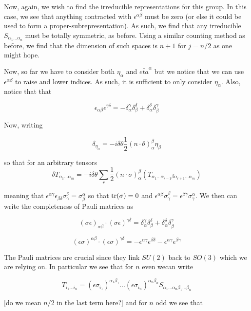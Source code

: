 \documentclass{article}
\theoremstyle{definition}
\begin{document}
Now, again, we wish to find the irreducible representations for this group. In
this case, we see that anything contracted with $\epsilon^{\alpha \beta}$ must
be zero (or else it could be used to form a proper-subrepresentation). As such,
we find that any irreducible $S_{\alpha_1 \dots \alpha_n}$ must be totally
symmetric, as before. Using a similar counting method as before, we find that
the dimension of such spaces is $n + 1$ for $j = n/2$ as one might hope. 

Now, so far we have to consider both $\eta_\alpha$ and $\bar{eta}^\alpha$ but we
notice that we can use $\epsilon^{\alpha \beta}$ to raise and lower indices. As
such, it is sufficient to only consider $\eta_\alpha$. Also, notice that that

$$ \epsilon_{\alpha \beta} \epsilon^{\gamma \delta} = -\delta_\alpha^\gamma
\delta_\beta^\delta + \delta_\alpha^\delta \delta_\beta^\gamma $$

Now, writing 

$$ \delta_{\eta_\alpha} = - i \delta \theta \frac{1}{2} (n \cdot
\theta)_\alpha^\beta \eta_\beta $$

so that for an arbitrary tensors
$$ \delta T_{\alpha_1 \dots \alpha_m} = -i \delta \theta \sum_r \frac{1}{2} (n
\cdot \sigma)_\alpha^\beta (T_{\alpha_1 \dots \alpha_{r - 1} \beta \alpha_{r +
    1} \dots \alpha_m}) $$

meaning that $\epsilon^{\alpha \gamma} \epsilon_{\beta \delta}
\sigma_\gamma^\delta = \sigma_\beta^\alpha$ so that $\tr(\sigma) = 0$ and
$\epsilon^{\alpha \beta} \sigma_\gamma^\beta = \epsilon^{\beta \gamma}
\sigma_\gamma^\alpha$. We then can write the completeness of Pauli matrices
as

$$ (\sigma \epsilon)_{\alpha \beta} \cdot (\sigma \epsilon)^{\gamma \delta} =
\delta_\alpha^\gamma \delta_\beta^\delta + \delta_\alpha^\delta
\delta_\beta^\gamma $$

$$ (\epsilon \sigma)^{\alpha \beta} \cdot (\epsilon \sigma)^{\gamma \delta} =
-\epsilon^{\alpha \gamma} \epsilon^{\beta \delta} - \epsilon^{\alpha \gamma}
\epsilon^{\beta \gamma} $$

The Pauli matrices are crucial since they link $SU(2)$ back to $SO(3)$ which we
are relying on. In particular we see that for $n$ even wecan write

$$ T_{i_1 \dots i_n} = (\epsilon \sigma_{i_1})^{\alpha_1 \beta_1} \dots
(\epsilon \sigma_{i_n})^{\alpha_n \beta_n} S_{\alpha_1 \dots \alpha_n \beta_1
  \dots \beta_n} $$

[do we mean $n/2$ in the last term here?] and for $n$ odd we see that
\end{document}
